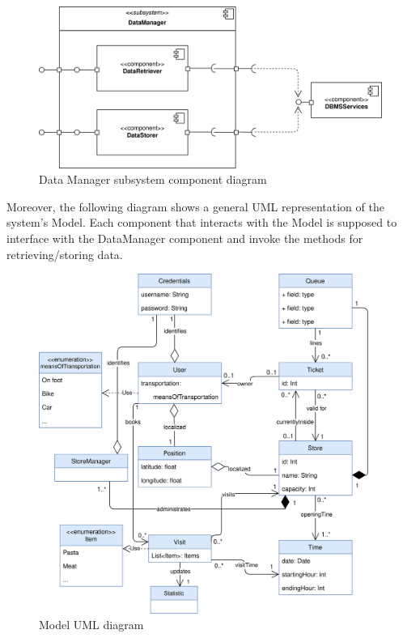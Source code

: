 \documentclass[]{article}
\begin{document}
			\begin{figure}[H]
			\centering
			\includegraphics[scale=0.9]{ComponentView/DataManagerComponent.png}
			\caption{Data Manager subsystem component diagram}
			\label{fig:DataManagerDiagram}
		\end{figure}
		
	\bigskip
	Moreover, the following diagram shows a general UML representation of the system's Model. \newline
	Each component that interacts with the Model is supposed to interface with the DataManager component and invoke the methods for retrieving/storing data. \newline
	
	\begin{figure}[H]
			\centering
			\includegraphics[scale=0.73]{ComponentView/umlDD.png}
			\caption{Model UML diagram}
			\label{fig:ModelUML}
		\end{figure}
	
\end{document}

